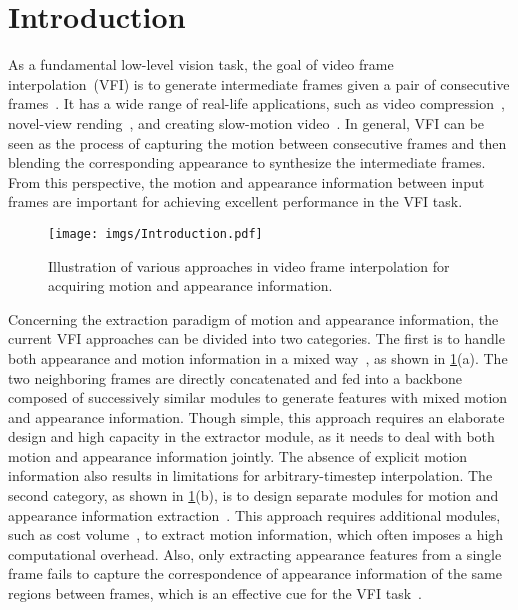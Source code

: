 \documentclass[10pt,twocolumn,letterpaper]{article}
\begin{document}
\section{Introduction}
\label{sec:intro}
As a fundamental low-level vision task, the goal of video frame interpolation~(VFI) is to generate intermediate frames given a pair of consecutive frames~\cite{huang2020rife,lu2022video}. It has a wide range of real-life applications, such as video compression~\cite{wu2018video}, novel-view rending~\cite{szeliski1999prediction,flynn2016deepstereo}, and creating slow-motion video~\cite{jiang2018super}. In general, VFI can be seen as the process of capturing the motion between consecutive frames and then blending the corresponding appearance to synthesize the intermediate frames. From this perspective, the motion and appearance information between input frames are important for achieving excellent performance in the VFI task.
 	\begin{figure}[t]
		\begin{center}
\texttt{[image: imgs/Introduction.pdf]}
		\end{center}
		\vspace{-0.13in}
		\caption{Illustration of various approaches in video frame interpolation for acquiring motion  and appearance information. }
		\label{fig:intro}
	\end{figure}
 
	


        
        Concerning the extraction paradigm of motion and appearance information, the current VFI approaches can be divided into two categories. The first is to handle both appearance and motion information in a mixed way~\cite{shi2022video, niklaus2017video, niklaus2017videoas, ding2021cdfi, gui2020featureflow,kalluri2020flavr,long2016learning,lu2022video,huang2020rife,bao2019depth,kong2022ifrnet}, as shown in \cref{fig:intro}(a). The two neighboring frames are directly concatenated and fed into a backbone composed of successively similar modules to generate features with mixed motion and appearance information. Though simple, this approach requires an elaborate design and high capacity in the extractor module, as it needs to deal with both motion and appearance information jointly. The absence of explicit motion information also results in limitations for arbitrary-timestep interpolation. The second category, as shown in \cref{fig:intro}(b), is to design separate modules for motion and appearance information extraction~\cite{reda2022film,niklaus2018context,danier2022st,xue2019video,sim2021xvfi,jia2022neighbor, park2020bmbc,park2021asymmetric}. This approach requires additional modules, such as cost volume~\cite{jia2022neighbor,park2020bmbc,park2021asymmetric}, to extract motion information, which often imposes a high computational overhead. Also, only extracting appearance features from a single frame fails to capture the correspondence of appearance information of the same regions between frames, which is an effective cue for the VFI task~\cite{jia2022neighbor}.
\end{document}

